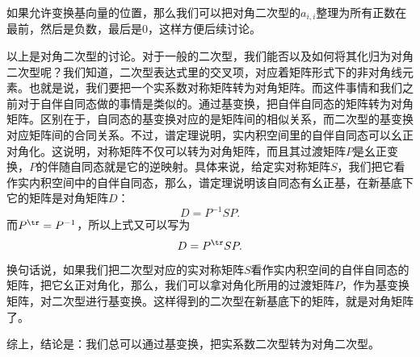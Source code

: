 \documentclass[12pt,UTF8]{ctexbook}
\begin{document}
如果允许变换基向量的位置，那么我们可以把对角二次型的$a_{i,i}$整理为所有正数在最前，然后是负数，最后是$0$，这样方便后续讨论。

以上是对角二次型的讨论。对于一般的二次型，我们能否以及如何将其化归为对角二次型呢？我们知道，二次型表达式里的交叉项，对应着矩阵形式下的非对角线元素。也就是说，我们要把一个实系数对称矩阵转为对角矩阵。而这件事情和我们之前对于自伴自同态做的事情是类似的。通过基变换，把自伴自同态的矩阵转为对角矩阵。区别在于，自同态的基变换对应的是矩阵间的相似关系，而二次型的基变换对应矩阵间的合同关系。不过，谱定理说明，实内积空间里的自伴自同态可以幺正对角化。这说明，对称矩阵不仅可以转为对角矩阵，而且其过渡矩阵$P$是幺正变换，$P$的伴随自同态就是它的逆映射。具体来说，给定实对称矩阵$S$，我们把它看作实内积空间中的自伴自同态，那么，谱定理说明该自同态有幺正基，在新基底下它的矩阵是对角矩阵$D$：
$$ D = P^{-1} S P.$$
而$P^{\tr} = P^{-1}$，所以上式又可以写为
$$ D = P^{\tr} S P.$$
换句话说，如果我们把二次型对应的实对称矩阵$S$看作实内积空间的自伴自同态的矩阵，把它幺正对角化，那么，我们可以拿对角化所用的过渡矩阵$P$，作为基变换矩阵，对二次型进行基变换。这样得到的二次型在新基底下的矩阵，就是对角矩阵了。

综上，结论是：我们总可以通过基变换，把实系数二次型转为对角二次型。
\end{document}
